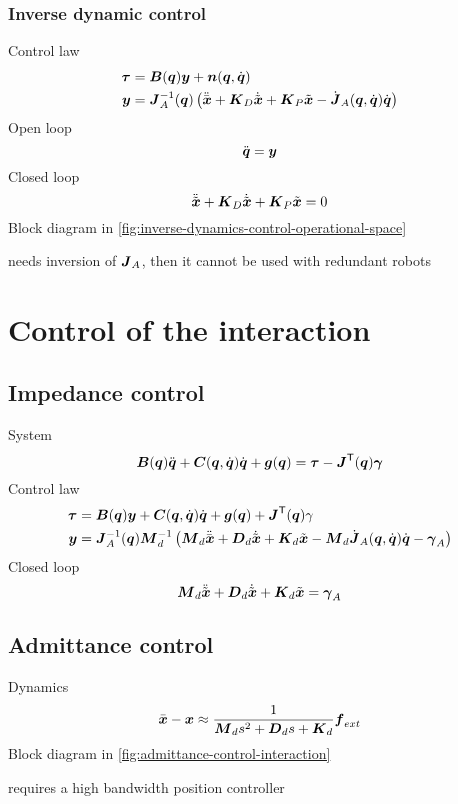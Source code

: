\subsubsection{Inverse dynamic control}

Control law
\begin{align*}
	\vect \tau &= \B(\q)\y + \n(\q,\dq) \\
	\y &= \J_A^\inv(\q) \left( \ddxd + \K_D\dxe + \K_P \xe - \dJ_A(\q,\dq)\dq \right)
\end{align*}
Open loop
\[
	\ddq = \y
\]
Closed loop
\[
	\ddxe + \K_D \dxe + \K_P \xe = 0
\]
Block diagram in \autoref{fig:inverse-dynamics-control-operational-space}
\begin{nb}needs inversion of $\J_A$, then it cannot be used with redundant robots\end{nb}

\section{Control of the interaction}

\subsection{Impedance control}
System
\[
	\B(\q)\ddq + \C(\q,\dq)\dq + \g(\q) = \vect\tau - \J^\trans(\q)\vect\gamma
\]
Control law
\begin{align*}
	\vect\tau &= \B(\q)\y + \C(\q,\dq)\dq + \g(\q) + \J^\trans(\q)\gamma \\
	\y &= \J_A^\inv(\q) \matr M_d^\inv \left( \matr M_d \ddxd + \matr D_d\dxe + \K_d \xe - \matr M_d \dJ_A(\q,\dq)\dq - \vect\gamma_A \right)
\end{align*}
Closed loop
\[
	\matr M_d \ddxe + \matr D_d \dxe + \K_d \xe = \vect\gamma_A
\]

\subsection{Admittance control}
Dynamics
\[
	\xd - \x \approx \frac{1}{\matr M_d s^2+ \matr D_d s+ \matr K_d } \vect f_{ext}
\]
Block diagram in \autoref{fig:admittance-control-interaction}
\begin{nb}requires a high bandwidth position controller\end{nb}